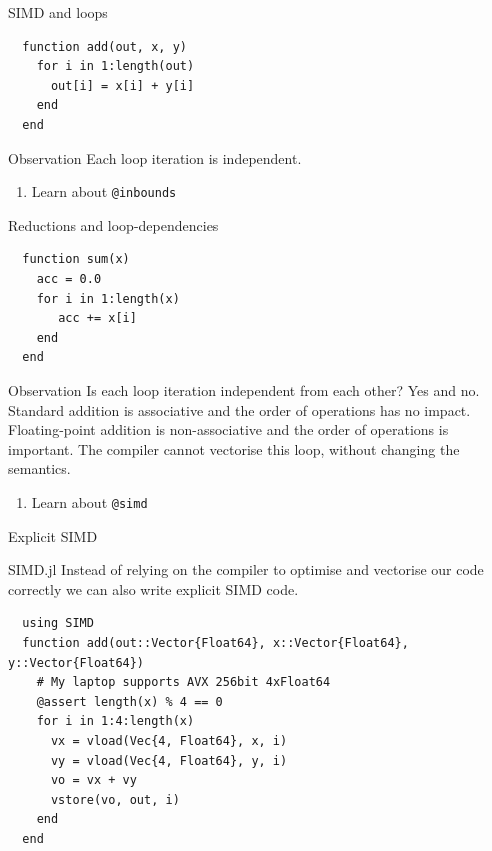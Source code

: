\documentclass{beamer}
\begin{document}
\begin{frame}[fragile]{SIMD and loops}
  \begin{lstlisting}
  function add(out, x, y)
    for i in 1:length(out)
      out[i] = x[i] + y[i]
    end
  end
  \end{lstlisting}

  \begin{block}{Observation}
    Each loop iteration is independent.
  \end{block}
  \begin{enumerate}
    \item Learn about \lstinline{@inbounds}
  \end{enumerate}
\end{frame}
\begin{frame}[fragile]{Reductions and loop-dependencies}
  \begin{lstlisting}
  function sum(x)
    acc = 0.0
    for i in 1:length(x)
       acc += x[i]
    end
  end
  \end{lstlisting}
  \begin{block}{Observation}
    Is each loop iteration independent from each other? Yes and no.
    Standard addition is associative and the order of operations has no impact.
    Floating-point addition is non-associative and the order of operations is important.
    The compiler cannot vectorise this loop, without changing the semantics.
  \end{block}
  \begin{enumerate}
    \item Learn about \lstinline{@simd}
  \end{enumerate}
\end{frame}
\begin{frame}[fragile]{Explicit SIMD}
  \begin{block}{SIMD.jl}
    Instead of relying on the compiler to optimise and vectorise our code correctly we can also write explicit SIMD code.
  \end{block}
  \begin{lstlisting}
  using SIMD
  function add(out::Vector{Float64}, x::Vector{Float64}, y::Vector{Float64})
    # My laptop supports AVX 256bit 4xFloat64
    @assert length(x) % 4 == 0
    for i in 1:4:length(x)
      vx = vload(Vec{4, Float64}, x, i)
      vy = vload(Vec{4, Float64}, y, i)
      vo = vx + vy
      vstore(vo, out, i)
    end
  end
  \end{lstlisting}
\end{frame}
\end{document}
